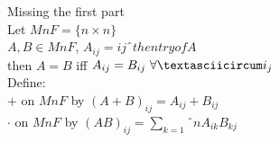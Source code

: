 \documentclass[11pt]{article}
\begin{document}
	Missing the first part\\
	Let $MnF = \{n\times n\}$\\
	$A,B \in Mn F$, $A_{ij}=ijˆ{th}entry of A$\\
	then $A=B$ iff $A_{ij}=B_{ij}\,\,\forallˆ{i}_{j}$\\
	Define:\\
	+ on $MnF$ by $(A+B)_{ij} = A_{ij}+B_{ij}$\\
	$\cdot$ on $MnF$ by $(AB)_{ij}=\sum\limits_{k=1}ˆ{n}A_{ik}B_{kj}$\\
	
\end{document}
